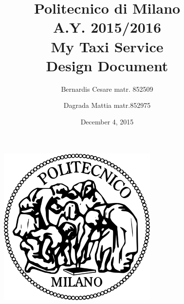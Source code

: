 \documentclass[11pt,a4paper,titlepage]{article}
\begin{document}
\begin{figure}
	\centering
	\includegraphics[scale=0.6]{../SE2_IMAGES/Logo_Politecnico_Milano}
\end{figure}
\title{Politecnico di Milano\\A.Y. 2015/2016\\\textbf{My Taxi Service}\\Design Document\\}
\author{Bernardis Cesare matr. 852509 \and Dagrada Mattia matr.852975}
\date{December 4, 2015}
\maketitle

\newpage

\tableofcontents

\newpage







\end{document}
